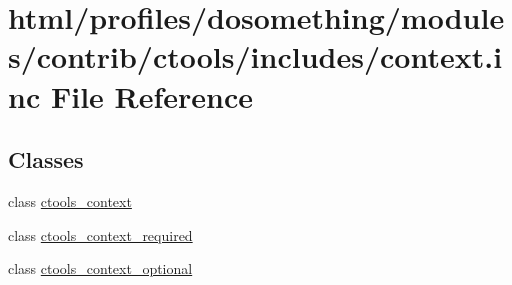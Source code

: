 \hypertarget{context_8inc}{
\section{html/profiles/dosomething/modules/contrib/ctools/includes/context.inc File Reference}
\label{context_8inc}
}
\subsection*{Classes}
\begin{DoxyCompactItemize}
\item 
class \hyperlink{classctools__context}{ctools\_\-context}
\item 
class \hyperlink{classctools__context__required}{ctools\_\-context\_\-required}
\item 
class \hyperlink{classctools__context__optional}{ctools\_\-context\_\-optional}
\end{DoxyCompactItemize}
